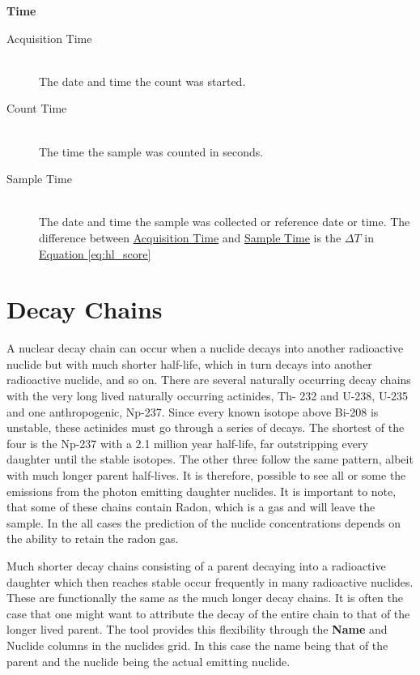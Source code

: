 \documentclass[12pt,report,justified]{SANDreport}
\begin{document}
\begin{center}
{\large \textbf{Time}}
\end{center}
\begin{description}
\item[Acquisition Time]\label{itm:time_acq} \hfill \\
The date and time the count was started.
\item[Count Time]\label{itm:time_cnt} \hfill \\
The time the sample was counted in seconds.
\item[Sample Time]\label{itm:time_smp} \hfill \\
The date and time the sample was collected or reference date or time. The difference between
\hyperref[itm:time_acq]{Acquisition Time} and \hyperref[itm:time_cnt]{Sample Time} is the
\(\Delta T\) in \hyperref[eq:hl_score]{Equation \ref{eq:hl_score}}
\end{description}

   \chapter{Decay Chains}\label{sec:decay_chain}
A nuclear decay chain can occur when a nuclide decays into another radioactive nuclide but with
much shorter half-life, which in turn decays into another radioactive nuclide, and so on. There are
several naturally occurring decay chains with the very long lived naturally occurring actinides, Th-
232 and U-238, U-235 and one anthropogenic, Np-237. Since every known isotope above Bi-208 is
unstable, these actinides must go through a series of decays. The shortest of the four is the Np-237
with a 2.1 million year half-life, far outstripping every daughter until the stable isotopes. The other
three follow the same pattern, albeit with much longer parent half-lives. It is therefore, possible to
see all or some the emissions from the photon emitting daughter nuclides. It is important to note,
that some of these chains contain Radon, which is a gas and will leave the sample. In the all cases
the prediction of the nuclide concentrations depends on the ability to retain the radon gas.

Much shorter decay chains consisting of a parent decaying into a radioactive daughter which then
reaches stable occur frequently in many radioactive nuclides. These are functionally the same as
the much longer decay chains. It is often the case that one might want to attribute the decay of the
entire chain to that of the longer lived parent. The tool provides this flexibility through the \textbf{Name}
and Nuclide columns in the nuclides grid. In this case the name being that of the parent and the
nuclide being the actual emitting nuclide.
\end{document}
